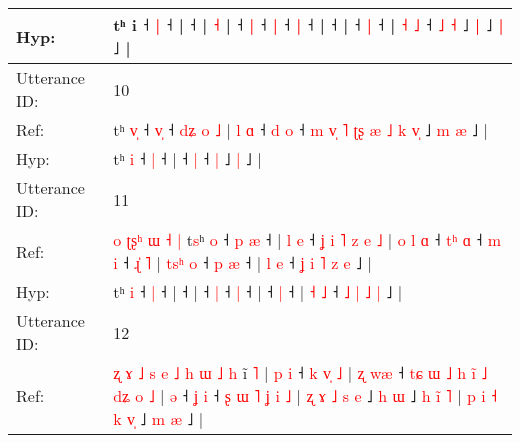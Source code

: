 \documentclass[10pt]{article}
\DeclareRobustCommand{\hl}[1]{{\textcolor{red}{#1}}}
\begin{document}
\begin{longtable}{ll}
 \\
Hyp: & tʰ i\hl{}\hl{}\hl{}\hl{}\hl{}\hl{}\hl{}\hl{}\hl{} ˧\hl{}\hl{} \hl{|} ˧ |\hl{}\hl{}\hl{}\hl{} ˧\hl{}\hl{}\hl{}\hl{}\hl{}\hl{}\hl{} |\hl{}\hl{}\hl{}\hl{}\hl{}\hl{}\hl{}\hl{}\hl{}\hl{} \hl{˧} |\hl{}\hl{}\hl{}\hl{}\hl{}\hl{} ˧\hl{}\hl{} \hl{|} ˧\hl{}\hl{}\hl{} \hl{|} ˧\hl{}\hl{}\hl{} \hl{|} ˧\hl{}\hl{}\hl{}\hl{}\hl{}\hl{}\hl{}\hl{}\hl{}\hl{}\hl{}\hl{}\hl{}\hl{} |\hl{}\hl{}\hl{}\hl{} ˧\hl{}\hl{}\hl{}\hl{}\hl{}\hl{}\hl{} |\hl{}\hl{}\hl{}\hl{}\hl{}\hl{} ˧\hl{}\hl{} \hl{|} ˧ | \hl{}\hl{˧} \hl{˩} ˧ \hl{˩} \hl{˧} ˩\hl{}\hl{} \hl{|} ˩\hl{}\hl{} \hl{}\hl{|} ˩ |
 \\
\midrule
Utterance ID: & 10 \\
Ref: & tʰ \hl{v}\hl{̩} ˧ \hl{v}\hl{̩} ˧\hl{ }\hl{d}\hl{ʑ}\hl{ }\hl{o}\hl{ }\hl{˩} |\hl{ }\hl{l}\hl{ }\hl{ɑ} ˧\hl{ }\hl{d} \hl{o} ˧\hl{ }\hl{m}\hl{ }\hl{v}\hl{̩}\hl{ }\hl{˥}\hl{ }\hl{ʈ}\hl{ʂ}\hl{ }\hl{æ}\hl{ }\hl{˩}\hl{ }\hl{k} \hl{v}\hl{̩} ˩\hl{ }\hl{m} \hl{æ} ˩ |
 \\
Hyp: & tʰ \hl{}\hl{i} ˧ \hl{}\hl{|} ˧\hl{}\hl{}\hl{}\hl{}\hl{}\hl{}\hl{} |\hl{}\hl{}\hl{}\hl{} ˧\hl{}\hl{} \hl{|} ˧\hl{}\hl{}\hl{}\hl{}\hl{}\hl{}\hl{}\hl{}\hl{}\hl{}\hl{}\hl{}\hl{}\hl{}\hl{}\hl{} \hl{}\hl{|} ˩\hl{}\hl{} \hl{|} ˩ |
 \\
\midrule
Utterance ID: & 11 \\
Ref: & \hl{o}\hl{ }\hl{ʈ}\hl{ʂ}\hl{ʰ}\hl{ }\hl{ɯ}\hl{ }\hl{˧}\hl{ }\hl{|}\hl{ }t\hl{s}ʰ \hl{o} ˧\hl{ }\hl{p} \hl{æ} ˧ |\hl{ }\hl{l}\hl{ }\hl{e} ˧\hl{ }\hl{ʝ}\hl{ }\hl{i}\hl{ }\hl{˥}\hl{ }\hl{z}\hl{ }\hl{e}\hl{ }\hl{˩} |\hl{ }\hl{o}\hl{ }\hl{l}\hl{ }\hl{ɑ} ˧\hl{ }\hl{t}\hl{ʰ} \hl{ɑ} ˧\hl{ }\hl{m} \hl{i} ˧\hl{ }\hl{ɻ}\hl{̍}\hl{ }\hl{˥} |\hl{ }\hl{t}\hl{s}\hl{ʰ}\hl{ }\hl{o} ˧\hl{ }\hl{p} \hl{æ} ˧ | \hl{l} \hl{e} ˧\hl{ }\hl{ʝ} \hl{i} \hl{˥} \hl{z} \hl{e} ˩ |
 \\
Hyp: & \hl{}\hl{}\hl{}\hl{}\hl{}\hl{}\hl{}\hl{}\hl{}\hl{}\hl{}\hl{}t\hl{}ʰ \hl{i} ˧\hl{}\hl{} \hl{|} ˧ |\hl{}\hl{}\hl{}\hl{} ˧\hl{}\hl{}\hl{}\hl{}\hl{}\hl{}\hl{}\hl{}\hl{}\hl{}\hl{}\hl{} |\hl{}\hl{}\hl{}\hl{}\hl{}\hl{} ˧\hl{}\hl{}\hl{} \hl{|} ˧\hl{}\hl{} \hl{|} ˧\hl{}\hl{}\hl{}\hl{}\hl{} |\hl{}\hl{}\hl{}\hl{}\hl{}\hl{} ˧\hl{}\hl{} \hl{|} ˧ | \hl{˧} \hl{˩} ˧\hl{}\hl{} \hl{˩} \hl{|} \hl{˩} \hl{|} ˩ |
 \\
\midrule
Utterance ID: & 12 \\
Ref: & \hl{ʐ}\hl{ }\hl{ɤ}\hl{ }\hl{˩}\hl{ }\hl{s}\hl{ }\hl{e}\hl{ }\hl{˩}\hl{ }\hl{h}\hl{ }\hl{ɯ}\hl{ }\hl{˩}\hl{ }\hl{h} i\hl{̃} \hl{˥} |\hl{ }\hl{p}\hl{ }\hl{i} ˧\hl{ }\hl{k}\hl{ }\hl{v}\hl{̩}\hl{ }\hl{˩} |\hl{ }\hl{ʐ}\hl{ }\hl{w}\hl{æ} ˧\hl{ }\hl{t}\hl{ɕ}\hl{ }\hl{ɯ}\hl{ }\hl{˩}\hl{ }\hl{h}\hl{ }\hl{i}\hl{̃}\hl{ }\hl{˩}\hl{ }\hl{d}\hl{ʑ}\hl{ }\hl{o}\hl{ }\hl{˩} |\hl{ }\hl{ə} ˧\hl{ }\hl{ʝ} \hl{i} ˧ \hl{ʂ} \hl{ɯ} \hl{˥} \hl{ʝ} \hl{i} \hl{˩} | \hl{ʐ} \hl{ɤ} \hl{˩} \hl{s} \hl{e} ˩\hl{ }\hl{h} \hl{ɯ} ˩\hl{ }\hl{h}\hl{ }\hl{i}\hl{̃}\hl{ }\hl{˥} |\hl{ }\hl{p}\hl{ }\hl{i}\hl{ }\hl{˧}\hl{ }\hl{k}\hl{ }\hl{v}\hl{̩} ˩\hl{ }\hl{m} \hl{æ} ˩ |

\end{longtable}
\end{document}
